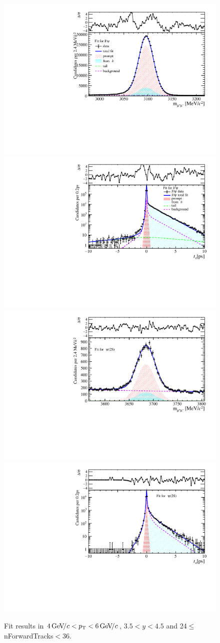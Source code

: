 \begin{figure}[H]
\begin{center}
\includegraphics[width=0.47\linewidth]{pdf/Jpsi/drawmassF/n3y3pt3.pdf}
\includegraphics[width=0.47\linewidth]{pdf/Jpsi/2DFitF/n3y3pt3.pdf}
\vspace*{-0.5cm}
\includegraphics[width=0.47\linewidth]{pdf/Psi2S/drawmassF/n3y3pt3.pdf}
\includegraphics[width=0.47\linewidth]{pdf/Psi2S/2DFitF/n3y3pt3.pdf}
\vspace*{-0.5cm}
\end{center}
\caption{Fit results in $4\text{\,Ge\kern -0.1em V\!/}c<p_{\mathrm{T}}<6\text{\,Ge\kern -0.1em V\!/}c$, $3.5<y<4.5$ and 24$\leq$nForwardTracks$<$36.}
\label{Fitn3y3pt3}
\end{figure}
